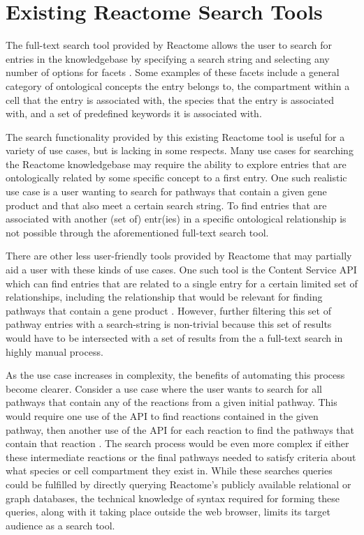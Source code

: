 \documentclass[12pt, letterpaper]{report}
\begin{document}
\section{Existing Reactome Search Tools}
The full-text search tool provided by Reactome allows the user to search for entries in the knowledgebase by specifying a search string and selecting any number of options for facets \cite{FabregatA.2016Trpk}. Some examples of these facets include a general category of ontological concepts the entry belongs to, the compartment within a cell that the entry is associated with, the species that the entry is associated with, and a set of predefined keywords it is associated with.

The search functionality provided by this existing Reactome tool is useful for a variety of use cases, but is lacking in some respects. Many use cases for searching the Reactome knowledgebase may require the ability to explore entries that are ontologically related by some specific concept to a first entry. One such realistic use case is a user wanting to search for pathways that contain a given gene product and that also meet a certain search string. To find entries that are associated with another (set of) entr(ies) in a specific ontological relationship is not possible through the aforementioned full-text search tool.

There are other less user-friendly tools provided by Reactome that may partially aid a user with these kinds of use cases. One such tool is the Content Service API which can find entries that are related to a single entry for a certain limited set of relationships, including the relationship that would be relevant for finding pathways that contain a gene product \cite{DataModelGeneralDescription}. However, further filtering this set of pathway entries with a search-string is non-trivial because this set of results would have to be intersected with a set of results from the a full-text search in highly manual process.

As the use case increases in complexity, the benefits of automating this process become clearer. Consider a use case where the user wants to search for all pathways that contain any of the reactions from a given initial pathway. This would require one use of the API to find reactions contained in the given pathway, then another use of the API for each reaction to find the pathways that contain that reaction \cite {ContentServiceAPIDocumentation}. The search process would be even more complex if either these intermediate reactions or the final pathways needed to satisfy criteria about what species or cell compartment they exist in. While these searches queries could be fulfilled by directly querying Reactome's publicly available relational or graph databases, the technical knowledge of syntax required for forming these queries, along with it taking place outside the web browser, limits its target audience as a search tool.
\end{document}
